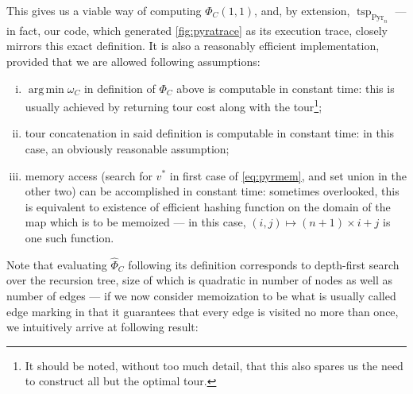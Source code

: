 \documentclass[index=totoc,bibliography=totoc]{scrartcl}
\DeclareMathOperator*{\argmin}{arg\,min}
\numberwithin{equation}{section}
\numberwithin{figure}{section}
\numberwithin{table}{section}
\begin{document}
\begin{remark}
\label{rem:timeass}
This gives us a viable way of computing $\Phi_C\left(1,1\right)$, and, by extension,
$\operatorname{tsp}_{\operatorname{Pyr}_n}$ --- in fact, our code, which
generated \cref{fig:pyratrace} as its execution trace, closely mirrors this exact
definition.
It is also a reasonably efficient implementation, provided that we are
allowed following assumptions:
  \begin{enumerate}[(i)]
    \item
      $\argmin \omega_C$ in definition of $\Phi_C$ above is computable in constant time:
      this is usually achieved by returning tour cost along with the
      tour\footnote{%
        It should be noted, without too much detail, that this also spares
        us the need to construct all but the optimal tour.
      };
    \item
      tour concatenation in said definition is computable in constant time:
      in this case, an obviously reasonable assumption;
    \item
      memory access (search for $v^\ast$ in first case of \eqref{eq:pyrmem},
      and set union in the other two) can be accomplished in constant time:
      sometimes overlooked, this is equivalent to existence of efficient hashing
      function on the domain of the map which is to be memoized ---
      in this case, $(i,j) \mapsto (n+1)\times i + j$ is one such function.
  \end{enumerate}
\end{remark}

Note that evaluating $\widehat{\Phi}_C$ following its definition corresponds to
depth-first search over the recursion tree, size of which is quadratic in number of nodes
as well as number of edges --- if we now consider memoization to be what
is usually called edge marking in that it guarantees that every edge
is visited no more than once, we intuitively arrive at following result:
\end{document}
